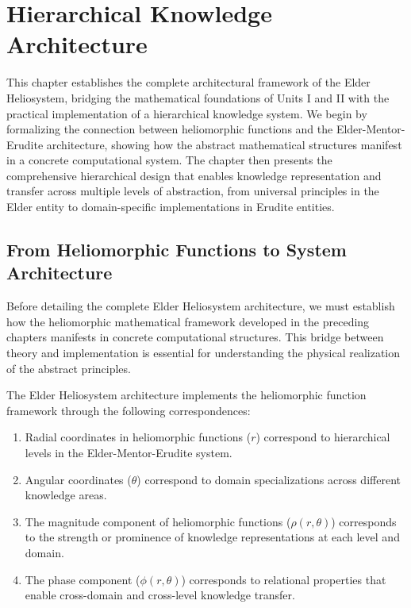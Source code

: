 \chapter{Hierarchical Knowledge Architecture}

\begin{chapterabstract}
This chapter establishes the complete architectural framework of the Elder Heliosystem, bridging the mathematical foundations of Units I and II with the practical implementation of a hierarchical knowledge system. We begin by formalizing the connection between heliomorphic functions and the Elder-Mentor-Erudite architecture, showing how the abstract mathematical structures manifest in a concrete computational system. The chapter then presents the comprehensive hierarchical design that enables knowledge representation and transfer across multiple levels of abstraction, from universal principles in the Elder entity to domain-specific implementations in Erudite entities.
\end{chapterabstract}

\section{From Heliomorphic Functions to System Architecture}

Before detailing the complete Elder Heliosystem architecture, we must establish how the heliomorphic mathematical framework developed in the preceding chapters manifests in concrete computational structures. This bridge between theory and implementation is essential for understanding the physical realization of the abstract principles.

\begin{theorem}
The Elder Heliosystem architecture implements the heliomorphic function framework through the following correspondences:
\begin{enumerate}
    \item Radial coordinates in heliomorphic functions ($r$) correspond to hierarchical levels in the Elder-Mentor-Erudite system.
    
    \item Angular coordinates ($\theta$) correspond to domain specializations across different knowledge areas.
    
    \item The magnitude component of heliomorphic functions ($\rho(r,\theta)$) corresponds to the strength or prominence of knowledge representations at each level and domain.
    
    \item The phase component ($\phi(r,\theta)$) corresponds to relational properties that enable cross-domain and cross-level knowledge transfer.
\end{enumerate}
\end{theorem}

